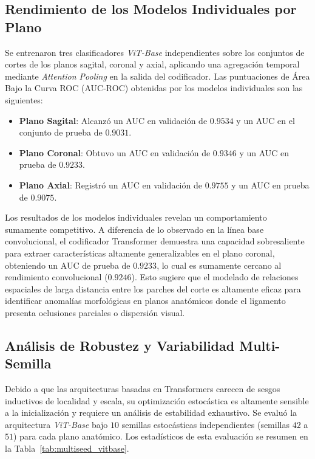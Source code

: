 \subsection{Rendimiento de los Modelos Individuales por Plano}
Se entrenaron tres clasificadores \textit{ViT-Base} independientes sobre los conjuntos de cortes de los planos sagital, coronal y axial, aplicando una agregación temporal mediante \textit{Attention Pooling} en la salida del codificador. Las puntuaciones de Área Bajo la Curva ROC (AUC-ROC) obtenidas por los modelos individuales son las siguientes:
\begin{itemize}
    \item \textbf{Plano Sagital}: Alcanzó un AUC en validación de $0.9534$ y un AUC en el conjunto de prueba de $0.9031$.
    \item \textbf{Plano Coronal}: Obtuvo un AUC en validación de $0.9346$ y un AUC en prueba de $0.9233$.
    \item \textbf{Plano Axial}: Registró un AUC en validación de $0.9755$ y un AUC en prueba de $0.9075$.
\end{itemize}

Los resultados de los modelos individuales revelan un comportamiento sumamente competitivo. A diferencia de lo observado en la línea base convolucional, el codificador Transformer demuestra una capacidad sobresaliente para extraer características altamente generalizables en el plano coronal, obteniendo un AUC de prueba de $0.9233$, lo cual es sumamente cercano al rendimiento convolucional ($0.9246$). Esto sugiere que el modelado de relaciones espaciales de larga distancia entre los parches del corte es altamente eficaz para identificar anomalías morfológicas en planos anatómicos donde el ligamento presenta oclusiones parciales o dispersión visual.

\subsection{Análisis de Robustez y Variabilidad Multi-Semilla}
Debido a que las arquitecturas basadas en Transformers carecen de sesgos inductivos de localidad y escala, su optimización estocástica es altamente sensible a la inicialización y requiere un análisis de estabilidad exhaustivo. Se evaluó la arquitectura \textit{ViT-Base} bajo $10$ semillas estocásticas independientes (semillas $42$ a $51$) para cada plano anatómico. Los estadísticos de esta evaluación se resumen en la Tabla~\ref{tab:multiseed_vitbase}.

